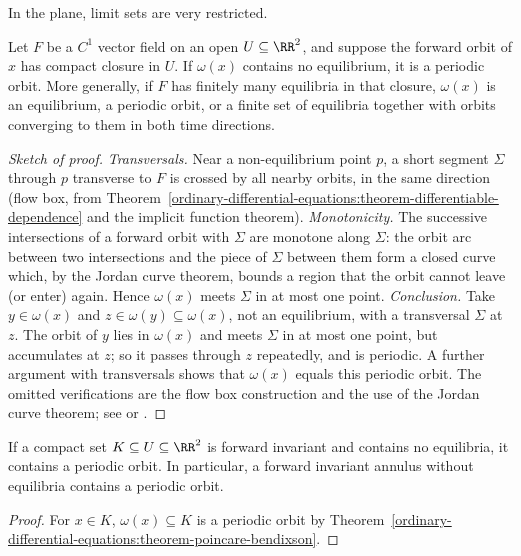 In the plane, limit sets are very restricted.

\begin{theorem}\label{ordinary-differential-equations:theorem-poincare-bendixson}
Let $F$ be a $C^1$ vector field on an open $U \subseteq \RR^2$, and suppose the forward orbit of $x$ has compact closure in $U$. If $\omega(x)$ contains no equilibrium, it is a periodic orbit. More generally, if $F$ has finitely many
equilibria in that closure, $\omega(x)$ is an equilibrium, a periodic orbit, or a finite set of equilibria together with orbits converging to them in both time directions.
\end{theorem}

\begin{proof}[Sketch of proof]
\emph{Transversals.} Near a non-equilibrium point $p$, a short segment $\Sigma$ through $p$ transverse to $F$ is crossed by all nearby orbits, in the same direction (flow box, from Theorem~\ref{ordinary-differential-equations:theorem-differentiable-dependence}
and the implicit function theorem). \emph{Monotonicity.} The successive intersections of a forward orbit with $\Sigma$ are monotone along $\Sigma$: the orbit arc between two intersections and the piece of $\Sigma$ between them form a closed curve
which, by the Jordan curve theorem, bounds a region that the orbit cannot leave (or enter) again. Hence $\omega(x)$ meets $\Sigma$ in at most one point. \emph{Conclusion.} Take $y \in \omega(x)$ and $z \in \omega(y) \subseteq \omega(x)$, not an
equilibrium, with a transversal $\Sigma$ at $z$. The orbit of $y$ lies in $\omega(x)$ and meets $\Sigma$ in at most one point, but accumulates at $z$; so it passes through $z$ repeatedly, and is periodic. A further argument with
transversals shows that $\omega(x)$ equals this periodic orbit. The omitted verifications are the flow box construction and the use of the Jordan curve theorem; see \cite[Chapter VII]{hartman-ode} or \cite[Chapter 7]{teschl-ode}.
\end{proof}

\begin{corollary}\label{ordinary-differential-equations:corollary-trapping}
If a compact set $K \subseteq U \subseteq \RR^2$ is forward invariant and contains no equilibria, it contains a periodic orbit. In particular, a forward invariant annulus without equilibria contains a periodic orbit.
\end{corollary}

\begin{proof}
For $x \in K$, $\omega(x) \subseteq K$ is a periodic orbit by Theorem~\ref{ordinary-differential-equations:theorem-poincare-bendixson}.
\end{proof}


